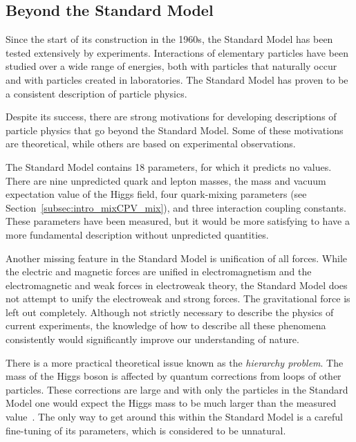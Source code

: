 \subsection{Beyond the Standard Model}
\label{subsec:intro_SM_beyond}

Since the start of its construction in the 1960s, the Standard Model has been tested extensively by experiments. Interactions of elementary
particles have been studied over a wide range of energies, both with particles that naturally occur and with particles created in
laboratories. The Standard Model has proven to be a consistent description of particle physics.

Despite its success, there are strong motivations for developing descriptions of particle physics that go beyond the Standard Model. Some
of these motivations are theoretical, while others are based on experimental observations.

The Standard Model contains 18 parameters, for which it predicts no values. There are nine unpredicted quark and lepton masses, the mass
and vacuum expectation value of the Higgs field, four quark-mixing parameters (see Section~\ref{subsec:intro_mixCPV_mix}), and three
interaction coupling constants. These parameters have been measured, but it would be more satisfying to have a more fundamental description
without unpredicted quantities.

Another missing feature in the Standard Model is unification of all forces. While the electric and magnetic forces are unified in
electromagnetism and the electromagnetic and weak forces in electroweak theory, the Standard Model does not attempt to unify the
electroweak and strong forces. The gravitational force is left out completely. Although not strictly necessary to describe the physics of
current experiments, the knowledge of how to describe all these phenomena consistently would significantly improve our understanding of
nature.

There is a more practical theoretical issue known as the \emph{hierarchy problem}. The mass of the Higgs boson is affected by quantum
corrections from loops of other particles. These corrections are large and with only the particles in the Standard Model one would expect
the Higgs mass to be much larger than the measured value~\cite{Weinberg:1975gm,*Susskind:1978ms,*'tHooft:1979bj}. The only way to get
around this within the Standard Model is a careful fine-tuning of its parameters, which is considered to be unnatural.

